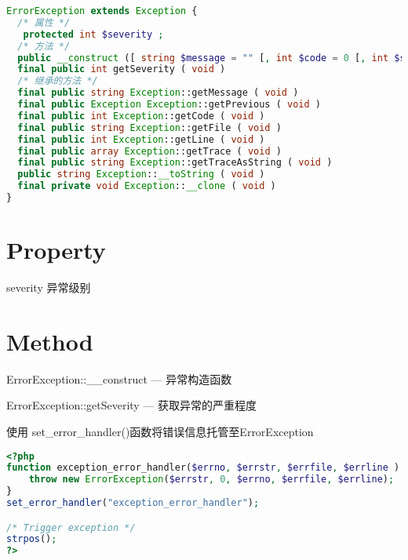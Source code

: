 \begin{lstlisting}[language=PHP]
ErrorException extends Exception {
  /* 属性 */
   protected int $severity ;
  /* 方法 */
  public __construct ([ string $message = "" [, int $code = 0 [, int $severity = 1 [, string $filename = __FILE__ [, int $lineno = __LINE__ [, Exception $previous = NULL ]]]]]] )
  final public int getSeverity ( void )
  /* 继承的方法 */
  final public string Exception::getMessage ( void )
  final public Exception Exception::getPrevious ( void )
  final public int Exception::getCode ( void )
  final public string Exception::getFile ( void )
  final public int Exception::getLine ( void )
  final public array Exception::getTrace ( void )
  final public string Exception::getTraceAsString ( void )
  public string Exception::__toString ( void )
  final private void Exception::__clone ( void )
}
\end{lstlisting}

\section{Property}


\begin{compactitem}
\item severity 异常级别
\end{compactitem}


\section{Method}


\begin{compactitem}
\item ErrorException::\_\_construct — 异常构造函数
\item ErrorException::getSeverity — 获取异常的严重程度
\end{compactitem}



\begin{example}
使用 set\_error\_handler()函数将错误信息托管至ErrorException
\begin{lstlisting}[language=PHP]
<?php
function exception_error_handler($errno, $errstr, $errfile, $errline ) {
    throw new ErrorException($errstr, 0, $errno, $errfile, $errline);
}
set_error_handler("exception_error_handler");

/* Trigger exception */
strpos();
?>
\end{lstlisting}
\end{example}

